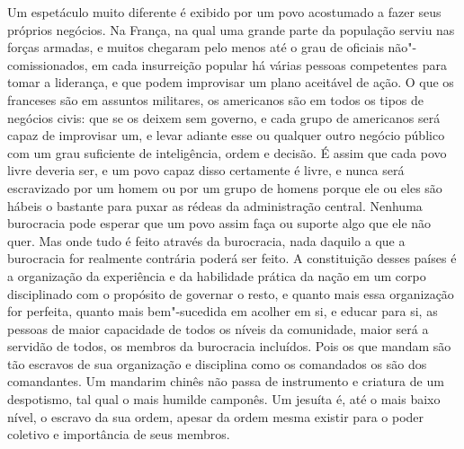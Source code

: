 Um espetáculo muito diferente é exibido por um povo acostumado a fazer
seus próprios negócios. Na França, na qual uma grande parte da
população serviu nas forças armadas, e muitos chegaram pelo menos até o
grau de oficiais não"-comissionados, em cada insurreição popular há
várias pessoas competentes para tomar a liderança, e que podem
improvisar um plano aceitável de ação. O que os franceses são em
assuntos militares, os americanos são em todos os tipos de negócios
civis: que se os deixem sem governo, e cada grupo de americanos será
capaz de improvisar um, e levar adiante esse ou qualquer outro negócio
público com um grau suficiente de inteligência, ordem e decisão. É
assim que cada povo livre deveria ser, e um povo capaz disso certamente
é livre, e nunca será escravizado por um homem ou por um grupo de
homens porque ele ou eles são hábeis o bastante para puxar as rédeas da
administração central. Nenhuma burocracia pode esperar que um povo
assim faça ou suporte algo que ele não quer. Mas onde tudo é feito
através da burocracia, nada daquilo a que a burocracia for realmente
contrária poderá ser feito. A constituição desses países é a
organização da experiência e da habilidade prática da nação em um corpo
disciplinado com o propósito de governar o resto, e quanto mais essa
organização for perfeita, quanto mais bem"-sucedida em acolher em si, e
educar para si, as pessoas de maior capacidade de todos os níveis da
comunidade, maior será a servidão de todos, os membros da burocracia
incluídos. Pois os que mandam são tão escravos de sua organização e
disciplina como os comandados os são dos comandantes. Um mandarim
chinês não passa de instrumento e criatura de um despotismo, tal qual o mais
humilde camponês. Um jesuíta é, até o mais baixo nível, o escravo da
sua ordem, apesar da ordem mesma existir para o poder coletivo e
importância de seus membros. 

